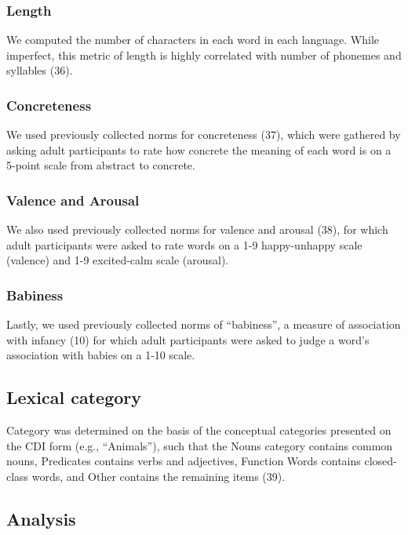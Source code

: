 \documentclass[english,man]{apa6}
\theoremstyle{definition}
\theoremstyle{definition}
\theoremstyle{definition}
\theoremstyle{remark}
\begin{document}
\subsubsection{Length}\label{length}

We computed the number of characters in each word in each language.
While imperfect, this metric of length is highly correlated with number
of phonemes and syllables (36).

\subsubsection{Concreteness}\label{concreteness}

We used previously collected norms for concreteness (37), which were
gathered by asking adult participants to rate how concrete the meaning
of each word is on a 5-point scale from abstract to concrete.

\subsubsection{Valence and Arousal}\label{valence-and-arousal}

We also used previously collected norms for valence and arousal (38),
for which adult participants were asked to rate words on a 1-9
happy-unhappy scale (valence) and 1-9 excited-calm scale (arousal).

\subsubsection{Babiness}\label{babiness}

Lastly, we used previously collected norms of \enquote{babiness}, a
measure of association with infancy (10) for which adult participants
were asked to judge a word's association with babies on a 1-10 scale.

\subsection{Lexical category}\label{lexical-category}

Category was determined on the basis of the conceptual categories
presented on the CDI form (e.g., \enquote{Animals}), such that the Nouns
category contains common nouns, Predicates contains verbs and
adjectives, Function Words contains closed-class words, and Other
contains the remaining items (39).

\subsection{Analysis}\label{analysis}
\end{document}
